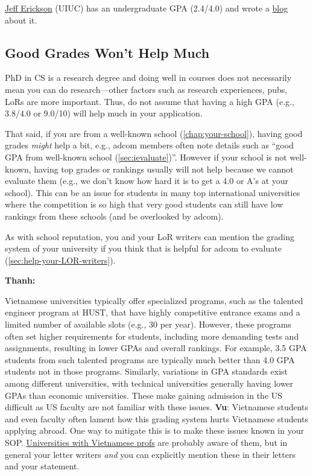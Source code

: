\documentclass[oneside,11pt]{book}
\newenvironment{commentbox}[1][]{
  \small
  \begin{marker}[\faChessPawn{}]
    {\textbf{#1}}
  }{
  \end{marker}
}
\begin{document}
\begin{commentbox}
\href{https://jeffe.cs.illinois.edu/}{Jeff Erickson} (UIUC) has an undergraduate GPA (2.4/4.0) and wrote a \href{https://jeffgerickson.substack.com/p/re-phd-with-low-gpa}{blog} about it.
\end{commentbox}


\subsection{Good Grades Won't Help Much}\label{sec:good-grades}

PhD in CS is a research degree and doing well in courses does not necessarily mean you can do research---other factors such as research experiences, pubs, LoRs are more important. Thus, do not assume that having a high GPA (e.g., 3.8/4.0 or 9.0/10) will help much in your application. 

That said, if you are from a well-known school (\autoref{chap:your-school}), having good grades \emph{might} help a bit, e.g., adcom members often note details such as ``good GPA from well-known school (\autoref{sec:ievaluate})''. However if your school is not well-known, having top grades or rankings usually will not help because we cannot evaluate them (e.g., we don't know how hard it is to get a 4.0 or A's at your school). This can be an issue for students in many top international universities where the competition is so high that very good students can still have low rankings from these schools (and be overlooked by adcom).

As with school reputation, you and your LoR writers can mention the grading system of your university if you think that is helpful for adcom to evaluate (\autoref{sec:help-your-LOR-writers}).


\begin{commentbox}[Thanh:]
    Vietnamese universities typically offer specialized programs, such as the talented engineer program at HUST, that have highly competitive entrance exams and a limited number of available slots (e.g., 30 per year). However, these programs often set higher requirements for students, including more demanding tests and assignments, resulting in lower GPAs and overall rankings. For example, 3.5 GPA students from such talented programs are typically much better than 4.0 GPA students not in those programs.  Similarly, variations in GPA standards exist among different universities, with technical universities generally having lower GPAs than economic universities. These make gaining admission in the US difficult as US faculty are not familiar with these issues.
    \tcblower
    \textbf{Vu}: Vietnamese students and even faculty often lament how this grading system hurts Vietnamese students applying abroad. One way to mitigate this is to make these issues known in your SOP.  \href{https://roars.dev/phd-cs-us/viet-cs-profs-us}{Universities with Vietnamese profs} are probably aware of them, but in general your letter writers \emph{and} you can explicitly mention these in their letters and your statement.
  \end{commentbox}
\end{document}
